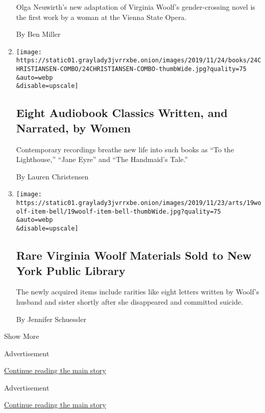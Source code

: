 \begin{enumerate}
  Olga Neuwirth's new adaptation of Virginia Woolf's gender-crossing
  novel is the first work by a woman at the Vienna State Opera.

  By Ben Miller
\item
  \href{/2019/11/22/books/review/audiobooks-beloved-toni-morrison-handmaids-tale-jane-eyre.html}{}

  \texttt{[image: https://static01.graylady3jvrrxbe.onion/images/2019/11/24/books/24CHRISTIANSEN-COMBO/24CHRISTIANSEN-COMBO-thumbWide.jpg?quality=75\\\&auto=webp\\\&disable=upscale]}

  \hypertarget{eight-audiobook-classics-written-and-narrated-by-women}{%
  \subsection{Eight Audiobook Classics Written, and Narrated, by
  Women}\label{eight-audiobook-classics-written-and-narrated-by-women}}

  Contemporary recordings breathe new life into such books as ``To the
  Lighthouse,'' ``Jane Eyre'' and ``The Handmaid's Tale.''

  By Lauren Christensen
\item
  \href{/2019/11/20/arts/virginia-woolf-nypl.html}{}

  \texttt{[image: https://static01.graylady3jvrrxbe.onion/images/2019/11/23/arts/19woolf-item-bell/19woolf-item-bell-thumbWide.jpg?quality=75\\\&auto=webp\\\&disable=upscale]}

  \hypertarget{rare-virginia-woolf-materials-sold-to-new-york-public-library}{%
  \subsection{Rare Virginia Woolf Materials Sold to New York Public
  Library}\label{rare-virginia-woolf-materials-sold-to-new-york-public-library}}

  The newly acquired items include rarities like eight letters written
  by Woolf's husband and sister shortly after she disappeared and
  committed suicide.

  By Jennifer Schuessler
\end{enumerate}

Show More

Advertisement

\protect\hyperlink{after-mid1}{Continue reading the main story}

Advertisement

\protect\hyperlink{after-mktg}{Continue reading the main story}

